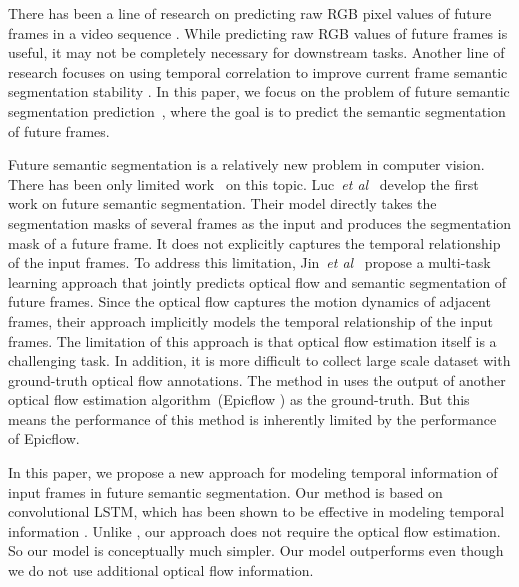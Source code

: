 \documentclass{bmvc2k}
\def\etal{\emph{et al}\bmvaOneDot}
\begin{document}
There has been a line of research on predicting raw RGB pixel values of future frames in a video sequence \cite{kalchbrenner2016video,mathieu2015deep,ranzato2014video,srivastava2015unsupervised}. While predicting raw RGB values of future frames is useful, it may not be completely necessary for downstream tasks. Another line of research focuses on using temporal correlation to improve current frame semantic segmentation stability \cite{li2018low,jin2017video,nilsson2016semantic,PatrauceanHC16}. In this paper, we focus on the problem of future semantic segmentation prediction~\cite{NextSegmPredICCV17}, where the goal is to predict the semantic segmentation of future frames. 

Future semantic segmentation is a relatively new problem in computer vision. There has been only limited work~\cite{NextSegmPredICCV17,jin2017predicting} on this topic. Luc~\etal~\cite{NextSegmPredICCV17} develop the first work on future semantic segmentation. Their model directly takes the segmentation masks of several frames as the input and produces the segmentation mask of a future frame. It does not explicitly captures the temporal relationship of the input frames. To address this limitation, Jin~\etal~\cite{jin2017predicting} propose a multi-task learning approach that jointly predicts optical flow and semantic segmentation of future frames. Since the optical flow captures the motion dynamics of adjacent frames, their approach implicitly models the temporal relationship of the input frames. The limitation of this approach is that optical flow estimation itself is a challenging task. In addition, it is more difficult to collect large scale dataset with ground-truth optical flow annotations. The method in \cite{jin2017predicting} uses the output of another optical flow estimation algorithm~(Epicflow \cite{revaud2015epicflow}) as the ground-truth. But this means the performance of this method is inherently limited by the performance of Epicflow.

In this paper, we propose a new approach for modeling temporal information of input frames in future semantic segmentation. Our method is based on convolutional LSTM, which has been shown to be effective in modeling temporal information \cite{NIPS2017_6689,finn2016unsupervised,PatrauceanHC16}. Unlike \cite{jin2017predicting}, our approach does not require the optical flow estimation. So our model is conceptually much simpler. Our model outperforms \cite{jin2017predicting} even though we do not use additional optical flow information.
    
\end{document}
